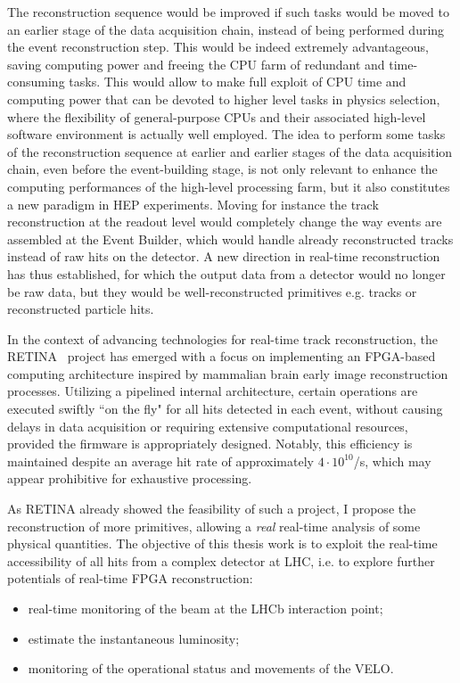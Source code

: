 The reconstruction sequence would be improved if such tasks would be moved to an earlier stage of the data acquisition chain, instead of being performed during the event reconstruction step. This would be indeed extremely advantageous, saving computing power and freeing the CPU farm of redundant and time-consuming tasks. This would allow to make full exploit of CPU time and computing power that can be devoted to higher level tasks in physics selection, where the flexibility of general-purpose CPUs and their associated high-level software environment is actually well employed.
The idea to perform some tasks of the reconstruction sequence at earlier and earlier stages of the data acquisition chain, even before the event-building stage, is not only relevant to enhance the computing performances of the high-level processing farm, but it also constitutes a new paradigm in HEP experiments. Moving for instance the track reconstruction at the readout level would completely change the way events are assembled at the Event Builder, which would handle already reconstructed tracks instead of raw hits on the detector. A new direction in real-time reconstruction has thus established, for which the output data from a detector would no longer be raw data, but they would be well-reconstructed primitives e.g. tracks or reconstructed particle hits.

In the context of advancing technologies for real-time track reconstruction, the RETINA~\cite{refId0} project has emerged with a focus on implementing an FPGA-based computing architecture inspired by  mammalian brain early image reconstruction processes. Utilizing a pipelined internal architecture, certain operations are executed swiftly ``on the fly" for all hits detected in each event, without causing delays in data acquisition or requiring extensive computational resources, provided the firmware is appropriately designed. Notably, this efficiency is maintained despite an average hit rate of approximately $4 \cdot 10^{10}$/s, which may appear prohibitive for exhaustive processing.

As RETINA already showed the feasibility of such a project, I propose the reconstruction of more primitives, allowing a \textit{real} real-time analysis of some physical quantities. 
The objective of this thesis work is to exploit the real-time accessibility of all hits from a complex detector at LHC, i.e. to explore further potentials of real-time FPGA reconstruction: 
\begin{itemize}
\item real-time monitoring of the beam at the LHCb interaction point;
\item estimate the instantaneous luminosity;
\item monitoring of the operational status and movements of the VELO.
\end{itemize}

